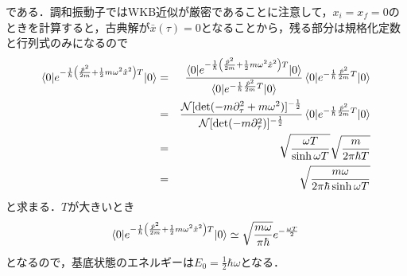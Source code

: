\documentclass[a4paper,11pt]{jsarticle}
\begin{document}
である．調和振動子ではWKB近似が厳密であることに注意して，$x_i=x_f=0$のときを計算すると，古典解が$\bar{x}(\tau)=0$となることから，残る部分は規格化定数と行列式のみになるので
\begin{eqnarray*}
\braket{0|e^{-\frac{1}{\hbar}\left(\frac{\hat{p}^2}{2m}+\frac{1}{2}m\omega^2\hat{x}^2\right)T}|0}&=&\frac{\braket{0|e^{-\frac{1}{\hbar}\left(\frac{\hat{p}^2}{2m}+\frac{1}{2}m\omega^2\hat{x}^2\right)T}|0}}{\braket{0|e^{-\frac{1}{\hbar}\frac{\hat{p}^2}{2m}T}|0}}\braket{0|e^{-\frac{1}{\hbar}\frac{\hat{p}^2}{2m}T}|0} \\
&=&\frac{\mathcal{N}[\mathrm{det}(-m\partial_\tau^2+m\omega^2)]^{-\frac{1}{2}}}{\mathcal{N}[\mathrm{det}(-m\partial_\tau^2)]^{-\frac{1}{2}}}\braket{0|e^{-\frac{1}{\hbar}\frac{\hat{p}^2}{2m}T}|0} \\
&=&\sqrt{\frac{\omega T}{\sinh{\omega T}}}\sqrt{\frac{m}{2\pi\hbar T}} \\
&=&\sqrt{\frac{m\omega}{2\pi\hbar\sinh{\omega T}}}
\end{eqnarray*}
と求まる．$T$が大きいとき
\begin{equation*}
\braket{0|e^{-\frac{1}{\hbar}\left(\frac{\hat{p}^2}{2m}+\frac{1}{2}m\omega^2\hat{x}^2\right)T}|0}\simeq\sqrt{\frac{m\omega}{\pi\hbar}}e^{-\frac{\omega T}{2}}
\end{equation*}
となるので，基底状態のエネルギーは$E_0=\frac{1}{2}\hbar\omega$となる．
%
%
%
\newpage
\end{document}
